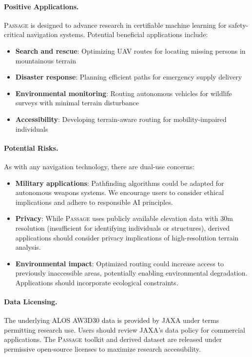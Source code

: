 \documentclass{article}
\newcommand{\dataset}{\textsc{Passage}}
\begin{document}
\paragraph{Positive Applications.}
\dataset{} is designed to advance research in certifiable machine learning for safety-critical navigation systems. Potential beneficial applications include:
\begin{itemize}[noitemsep]
    \item \textbf{Search and rescue}: Optimizing UAV routes for locating missing persons in mountainous terrain
    \item \textbf{Disaster response}: Planning efficient paths for emergency supply delivery
    \item \textbf{Environmental monitoring}: Routing autonomous vehicles for wildlife surveys with minimal terrain disturbance
    \item \textbf{Accessibility}: Developing terrain-aware routing for mobility-impaired individuals
\end{itemize}

\paragraph{Potential Risks.}
As with any navigation technology, there are dual-use concerns:
\begin{itemize}[noitemsep]
    \item \textbf{Military applications}: Pathfinding algorithms could be adapted for autonomous weapons systems. We encourage users to consider ethical implications and adhere to responsible AI principles.
    \item \textbf{Privacy}: While \dataset{} uses publicly available elevation data with 30m resolution (insufficient for identifying individuals or structures), derived applications should consider privacy implications of high-resolution terrain analysis.
    \item \textbf{Environmental impact}: Optimized routing could increase access to previously inaccessible areas, potentially enabling environmental degradation. Applications should incorporate ecological constraints.
\end{itemize}

\paragraph{Data Licensing.}
The underlying ALOS AW3D30 data is provided by JAXA under terms permitting research use. Users should review JAXA's data policy for commercial applications. The \dataset{} toolkit and derived dataset are released under permissive open-source licenses to maximize research accessibility.
\end{document}
